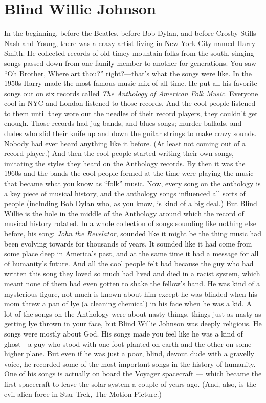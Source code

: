 \documentclass[letterpaper,single]{article}
\begin{document}
\section{Blind Willie Johnson}
In the beginning, before the Beatles, before Bob Dylan, and before Crosby Stills Nash and Young, there was a crazy artist living in New York City named Harry Smith. 
He collected records of old-timey mountain folks from the south, singing songs passed down from one family member to another for generations. 
You saw ``Oh Brother, Where art thou?'' right?---that's what the songs were like. 
In the 1950s Harry made the most famous music mix of all time. 
He put all his favorite songs out on six records called \emph{The Anthology of American Folk Music}. 
Everyone cool in NYC and London listened to those records.
And the cool people listened to them until they wore out the needles of their record players, they couldn't get enough. 
Those records had jug bands, and blues songs; murder ballads, and dudes who slid their knife up and down the guitar strings to make crazy sounds.
Nobody had ever heard anything like it before. (At least not coming out of a record player.)
And then the cool people started writing their own songs, imitating the styles they heard on the Anthology records. 
By then it was the 1960s and the bands the cool people formed at the time were playing the music that became what you know as ``folk'' music.
Now, every song on the anthology is a key piece of musical history, and the anthology songs influenced all sorts of people (including Bob Dylan who, as you know, is kind of a big deal.)
But Blind Willie is the hole in the middle of the Anthology around which the record of musical history rotated.
In a whole collection of songs sounding like nothing else before, his song: \emph{John the Revelator}, sounded like it might be the thing music had been evolving towards for thousands of years.
It sounded like it had come from some place deep in America's past, and at the same time it had a message for all of humanity's future.
And all the cool people felt bad because the guy who had written this song they loved so much had lived and died in a racist system, which meant none of them had even gotten to shake the fellow's hand.
He was kind of a mysterious figure, not much is known about him except he was blinded when his mom threw a pan of lye (a cleaning chemical) in his face when he was a kid.
A lot of the songs on the Anthology were about nasty things, things just as nasty as getting lye thrown in your face, but Blind Willie Johnson was deeply religious. He songs were mostly about God.
His songs made you feel like he was a kind of ghost---a guy who stood with one foot planted on earth and the other on some higher plane.
But even if he was just a poor, blind, devout dude with a gravelly voice, he recorded some of the most important songs in the history of humanity.
One of his songs is actually on board the Voyager spacecraft --- which became the first spacecraft to leave the solar system a couple of years ago. (And, also, is the evil alien force in Star Trek, The Motion Picture.)
\end{document}
